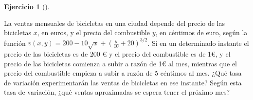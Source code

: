 \documentclass[
  a4paper,
]{scrreport}
\theoremstyle{definition}
\newtheorem{exercise}{Ejercicio}[chapter]
\theoremstyle{remark}
\begin{document}
\begin{exercise}[]\protect\hypertarget{exr-regla-cadena-5}{}\label{exr-regla-cadena-5}

La ventas mensuales de bicicletas en una ciudad depende del precio de
las bicicletas \(x\), en euros, y el precio del combustible \(y\), en
céntimos de euro, según la función
\(v(x,y)=200-10\sqrt{x}+(\frac{y}{10}+20)^{3/2}\). Si en un determinado
instante el precio de las bicicletas es de 200 € y el precio del
combustible es de 1€, y el precio de las bicicletas comienza a subir a
razón de 1€ al mes, mientras que el precio del combustible empieza a
subir a razón de 5 céntimos al mes. ¿Qué tasa de variación
experimentarán las ventas de bicicletas en ese instante? Según esta tasa
de variación, ¿qué ventas aproximadas se espera tener el próximo mes?

\end{exercise}
\end{document}
